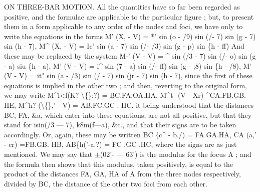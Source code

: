 \documentclass[12pt,a4paper]{article}
\begin{document}
ON THREE-BAR MOTION.
All
the
quantities
have
so
far
been
regarded
as
positive,
and
the
formulae
are
applicable
to
the
particular
figure
;
but,
to
present
them
in
a
form
applicable
to any
order of the nodes and
foci, we have only
to
write the equations in the forms
M' (X,\guillemotright{} - V) = *' sin (o - /9) sin (/- 7) sin (g - 7) sin (h - 7),
M\textasciicircum{} (X,\guillemotright{} - V) = Ic' sin (a - 7) sin (/- /3) sin (g - p) sin \{h - ff)
And these may be replaced by the system
M-' (V - V) = \textasciicircum{} sin (/3 - 7) sin (/- o) sin (g - a) siu \{h -
a),
M' (V - V) = i\textasciicircum{} sin (7 - a) sin (/- ff) sin (g - ;8) sin \{h - /8),
M' (V - V) = it" sin (a - /3) sin (/ - 7) sin (jr - 7) sin (h - 7),
since
the
first
of
these
equations
is
implied
in
the
other
two
;
and
then,
reverting
to the original
form, we may write
M\textasciicircum{}l<f(K?-\textbackslash\{\}:?) = BC.FA.OA.HA,
M\textasciicircum{}t- (V - Xr) \textasciicircum{}CA.FB.GB. HE,
M\textasciicircum{}h? (\textbackslash\{\},' - V) = AB.FC.GC
. HC.
it
being
understood
that
the
distances BC, FA, \&a, which
enter
into
these
equations,
are
not
all
positive,
but
that
they
stand
for
isin(/3 --- 7), k8m(f---a),
\&c.,
and
that
their signs are
to be taken accordingly.
Or, again, these may be
written
BC \{c\textasciicircum{} - b./) = FA.GA.HA,
CA (a,' - cr) =FB.GB. HB,
AB\{h('-a.?) = FC .GC .HC,
where
the
signs
are
as
just
mentioned.
We may
say
that
$\pm$(02'- --- 63')
is
the modulus
for
the
focus A
;
and
the
formula
then
shows
that
this
modulus,
taken
positively,
is
equal
to
the
product
of
the
distances FA,
GA, HA
of A
from
the
three
nodes
respectively, divided by BC, the
distance of the other two
foci from each
other.
\end{document}
